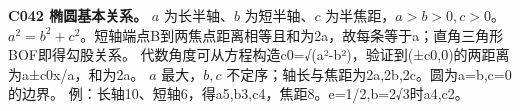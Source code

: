 \textbf{C042 椭圆基本关系。} $a$ 为长半轴、$b$ 为短半轴、$c$ 为半焦距，$a>b>0,c>0$。
$a^2=b^2+c^2$。短轴端点B到两焦点距离相等且和为2a，故每条等于a；直角三角形BOF即得勾股关系。
代数角度可从方程构造c0=√(a²-b²)，验证到(±c0,0)的两距离为a±c0x/a，和为2a。
$a$ 最大，$b,c$ 不定序；轴长与焦距为2a,2b,2c。圆为a=b,c=0的边界。
例：长轴10、短轴6，得a5,b3,c4，焦距8。e=1/2,b=2√3时a4,c2。

